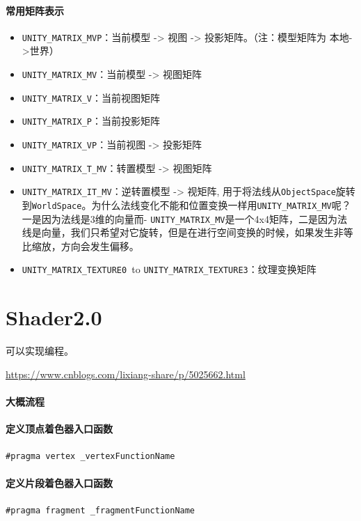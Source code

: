 \documentclass[UTF8,a4paper,12pt]{ctexbook}
\begin{document}
		\paragraph{常用矩阵表示}
			\begin{itemize}
				\item \verb|UNITY_MATRIX_MVP|：当前模型 -> 视图 -> 投影矩阵。（注：模型矩阵为 本地->世界）
				\item \verb|UNITY_MATRIX_MV|：当前模型 -> 视图矩阵
				\item \verb|UNITY_MATRIX_V|：当前视图矩阵
				\item \verb|UNITY_MATRIX_P|：当前投影矩阵
				\item \verb|UNITY_MATRIX_VP|：当前视图 -> 投影矩阵
				\item \verb|UNITY_MATRIX_T_MV|：转置模型 -> 视图矩阵
				\item \verb|UNITY_MATRIX_IT_MV|：逆转置模型 -> 视矩阵, 用于将法线从\verb|ObjectSpace|旋转到\verb|WorldSpace|。为什么法线变化不能和位置变换一样用\verb|UNITY_MATRIX_MV|呢？一是因为法线是3维的向量而- \verb|UNITY_MATRIX_MV|是一个4x4矩阵，二是因为法线是向量，我们只希望对它旋转，但是在进行空间变换的时候，如果发生非等比缩放，方向会发生偏移。
				\item \verb|UNITY_MATRIX_TEXTURE0 |to \verb|UNITY_MATRIX_TEXTURE3|：纹理变换矩阵
			\end{itemize}
			
	\section{Shader2.0}
		可以实现编程。
		
		\url{https://www.cnblogs.com/lixiang-share/p/5025662.html}
		
		\paragraph{大概流程}

		
		\paragraph{定义顶点着色器入口函数}
			\verb|#pragma vertex _vertexFunctionName |
			
		\paragraph{定义片段着色器入口函数}
			\verb|#pragma fragment _fragmentFunctionName |
\end{document}
